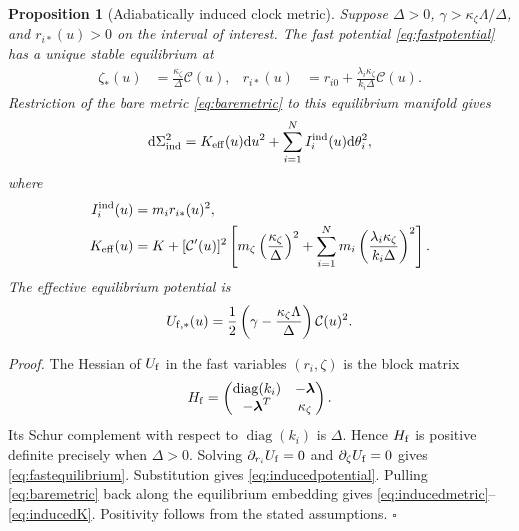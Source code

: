 \documentclass[11pt]{article}
\theoremstyle{plain}
\newtheorem{proposition}[theorem]{Proposition}
\newcommand{\dd}{\mathrm d}
\newcommand{\QED}{\hfill$\square$}
\begin{document}
\begin{proposition}[Adiabatically induced clock metric]
\label{prop:induced}
Suppose $\Delta>0$, $\gamma>\kappa_\zeta\Lambda/\Delta$, and
$r_{i*}(u)>0$ on the interval of interest.  The fast potential
\eqref{eq:fastpotential} has a unique stable equilibrium at
\begin{align}
 \zeta_*(u)&=\frac{\kappa_\zeta}{\Delta}\mathcal C(u),
 &
 r_{i*}(u)&=r_{i0}
 +\frac{\lambda_i\kappa_\zeta}{k_i\Delta}\mathcal C(u).
 \label{eq:fastequilibrium}
\end{align}
Restriction of the bare metric \eqref{eq:baremetric} to this equilibrium
manifold gives
\begin{equation}
 \dd\Sigma_{\rm ind}^2
 =K_{\rm eff}(u)\dd u^2
 +\sum_{i=1}^{N}I_i^{\rm ind}(u)\dd\theta_i^2,
 \label{eq:inducedmetric}
\end{equation}
where
\begin{align}
 I_i^{\rm ind}(u)
 &=m_i r_{i*}(u)^2,
 \label{eq:inducedinertia}\\
 K_{\rm eff}(u)
 &=K+[\mathcal C'(u)]^2
 \left[
 m_\zeta\left(\frac{\kappa_\zeta}{\Delta}\right)^2
 +\sum_{i=1}^{N}m_i
 \left(\frac{\lambda_i\kappa_\zeta}
 {k_i\Delta}\right)^2
 \right].
 \label{eq:inducedK}
\end{align}
The effective equilibrium potential is
\begin{equation}
 U_{\rm f,*}(u)
 =\frac12
 \left(\gamma-\frac{\kappa_\zeta\Lambda}{\Delta}\right)
 \mathcal C(u)^2.
 \label{eq:inducedpotential}
\end{equation}
\end{proposition}
\noindent\emph{Proof.}
The Hessian of $U_{\rm f}$ in the fast variables $(r_i,\zeta)$ is the
block matrix
\begin{equation}
 H_{\rm f}=
 \begin{pmatrix}
  \operatorname{diag}(k_i)&-\boldsymbol\lambda\\
  -\boldsymbol\lambda^T&\kappa_\zeta
 \end{pmatrix}.
\end{equation}
Its Schur complement with respect to $\operatorname{diag}(k_i)$ is
$\Delta$.  Hence $H_{\rm f}$ is positive definite precisely when
$\Delta>0$.  Solving $\partial_{r_i}U_{\rm f}=0$ and
$\partial_\zeta U_{\rm f}=0$ gives \eqref{eq:fastequilibrium}.
Substitution gives \eqref{eq:inducedpotential}.  Pulling
\eqref{eq:baremetric} back along the equilibrium embedding gives
\eqref{eq:inducedmetric}--\eqref{eq:inducedK}.  Positivity follows from the
stated assumptions. \QED
\end{document}
